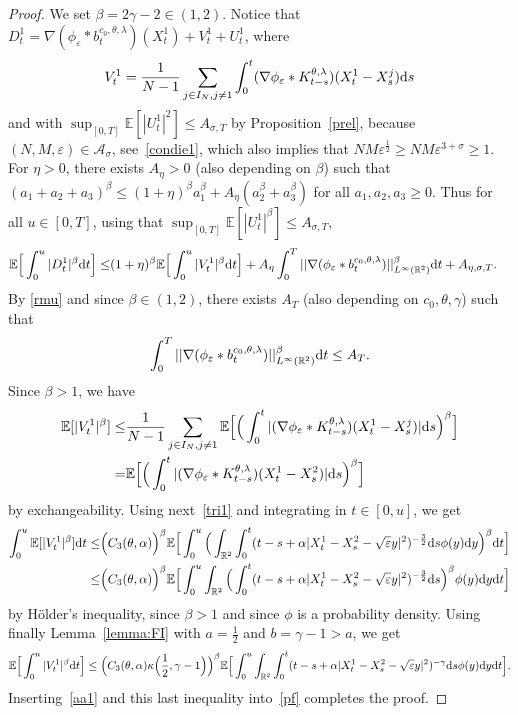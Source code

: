 \documentclass[11pt]{article}
\newcommand{\E}{\mathbb{E}}
\newcommand{\R}{\mathbb{R}}
\newcommand{\1}{\mathbbm{1}}
\newcommand{\dd}{{\rm d}}
\newcommand{\Aa}{\mathcal A}
\newcommand{\e}{\varepsilon}
\begin{document}
\begin{proof} We set $\beta=2\gamma-2 \in (1,2)$.
Notice that
$D^1_t= \nabla (\phi_\e\ast b^{c_0,\theta,\lambda}_t)(X^1_t)+ V_t^1+ U^1_t$, where
$$
V_t^1=\frac1{N-1}\sum_{j\in I_N,j\neq 1}\int_0^t  (\nabla \phi_{\e}\ast K^{\theta,\lambda}_{t-s})(X^1_t-X^{j}_s)\dd s
$$
and with $\sup_{[0,T]} \E[|U^1_t|^2] \leq A_{\sigma,T}$ by Proposition~\ref{prel}, because $(N,M,\e)\in \Aa_\sigma$, see~\eqref{condie1}, which also implies that $NM\e^{\frac12} \geq NM\e^{3+\sigma}\geq 1$.
For $\eta>0$, there exists $A_{\eta}>0$ (also depending on $\beta$) 
such that $(a_1+a_2+a_3)^\beta\leq (1+\eta)^\beta a_1^\beta + A_{\eta}(a_2^\beta+a_3^\beta)$ for all 
$a_1,a_2,a_3\geq 0$. Thus for all $u\in [0,T]$, using that $\sup_{[0,T]} \E[|U^1_t|^\beta] \leq A_{\sigma,T}$,
\begin{align}\label{pf}
\E\Big[\int_0^u |D^1_t|^\beta\dd t\Big]\leq& (1+\eta)^\beta\E\Big[\int_0^u |V^1_t|^\beta\dd t\Big]
+ A_{\eta} \int_0^T ||\nabla (\phi_{\e}\ast  b^{c_0,\theta,\lambda}_t) ||^\beta_{L^\infty(\R^2)} \dd t 
+ A_{\eta,\sigma,T}.
\end{align}
By \eqref{rmu} and since $\beta \in (1,2)$, there exists $A_{T}$
(also depending on $c_0,\theta,\gamma$) such that
\begin{equation}\label{aa1}
\int_0^T ||\nabla (\phi_{\e}\ast b^{c_0,\theta,\lambda}_t) ||^\beta_{L^\infty(\R^2)} \dd t \leq A_{T}.
\end{equation}
Since $\beta>1$, we have
\begin{align*}
\E[|V^1_t|^\beta] \leq& \frac1{N-1}\sum_{j\in I_N,j\neq 1}\E\Big[\Big(\int_0^t  
|(\nabla \phi_{\e}\ast K^{\theta,\lambda}_{t-s})(X^1_t-X^{j}_s)|\dd s\Big)^\beta \Big]\\
=&\E\Big[\Big(\int_0^t  
|(\nabla \phi_{\e}\ast K^{\theta,\lambda}_{t-s})(X^1_t-X^{2}_s)|\dd s\Big)^\beta \Big]
\end{align*}
by exchangeability. Using next~\eqref{tri1} and integrating in $t\in [0,u]$, we get 
\begin{align*}
\int_0^u \E[|V^1_t|^\beta] \dd t\leq& \Big(C_3(\theta,\alpha)\Big)^\beta
\E\Big[\int_0^u \Big(\int_{\R^2}\int_0^t (t-s+\alpha |X^1_t-X^2_s-\sqrt\e y|^2)^{-\frac{3}{2}} \dd s\phi(y)\dd y\Big)^\beta \dd t\Big]\\
\leq& \Big(C_3(\theta,\alpha)\Big)^\beta
\E\Big[\int_0^u  \int_{\R^2}\Big(\int_0^t (t-s+\alpha |X^1_t-X^2_s-\sqrt\e y|^2)^{-\frac{3}{2}} \dd s\Big)^\beta \phi(y)\dd y\dd t\Big]
\end{align*}
by Hölder's inequality, since $\beta>1$ and since $\phi$ is a probability density.
Using finally Lemma~\ref{lemma:FI} with $a=\frac 12$ and $b=\gamma-1>a$, we get
\begin{equation*}
\E\Big[\int_0^u |V^1_t|^\beta \dd t \Big] \leq
\Big(C_3(\theta,\alpha)\kappa\Big(\frac12,\gamma-1\Big)\Big)^\beta
\E\Big[\int_0^u \int_{\R^2}\int_0^t  (t-s+\alpha |X^1_t-X^2_s-\sqrt\e y|^2)^{-\gamma} 
\dd s \phi(y)\dd y\dd t\Big].
\end{equation*}
Inserting~\eqref{aa1} and this last inequality
into~\eqref{pf} completes the proof.
\end{proof}
\end{document}
